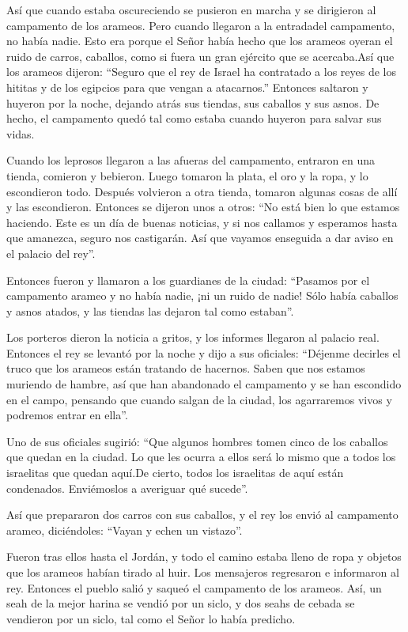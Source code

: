  Así que cuando estaba oscureciendo se pusieron en marcha y
se dirigieron al campamento de los arameos. Pero cuando llegaron a la
entradadel campamento, no había nadie.  Esto era porque el
Señor había hecho que los arameos oyeran el ruido de carros, caballos,
como si fuera un gran ejército que se acercaba.Así que los arameos
dijeron: ``Seguro que el rey de Israel ha contratado a los reyes de los
hititas y de los egipcios para que vengan a atacarnos.'' 
Entonces saltaron y huyeron por la noche, dejando atrás sus tiendas, sus
caballos y sus asnos. De hecho, el campamento quedó tal como estaba
cuando huyeron para salvar sus vidas.

 Cuando los leprosos llegaron a las afueras del campamento,
entraron en una tienda, comieron y bebieron. Luego tomaron la plata, el
oro y la ropa, y lo escondieron todo. Después volvieron a otra tienda,
tomaron algunas cosas de allí y las escondieron.  Entonces
se dijeron unos a otros: ``No está bien lo que estamos haciendo. Este es
un día de buenas noticias, y si nos callamos y esperamos hasta que
amanezca, seguro nos castigarán. Así que vayamos enseguida a dar aviso
en el palacio del rey''.

 Entonces fueron y llamaron a los guardianes de la ciudad:
``Pasamos por el campamento arameo y no había nadie, ¡ni un ruido de
nadie! Sólo había caballos y asnos atados, y las tiendas las dejaron tal
como estaban''.

 Los porteros dieron la noticia a gritos, y los informes
llegaron al palacio real.  Entonces el rey se levantó por
la noche y dijo a sus oficiales: ``Déjenme decirles el truco que los
arameos están tratando de hacernos. Saben que nos estamos muriendo de
hambre, así que han abandonado el campamento y se han escondido en el
campo, pensando que cuando salgan de la ciudad, los agarraremos vivos y
podremos entrar en ella''.

 Uno de sus oficiales sugirió: ``Que algunos hombres tomen
cinco de los caballos que quedan en la ciudad. Lo que les ocurra a ellos
será lo mismo que a todos los israelitas que quedan aquí.De cierto,
todos los israelitas de aquí están condenados. Enviémoslos a averiguar
qué sucede''.

 Así que prepararon dos carros con sus caballos, y el rey
los envió al campamento arameo, diciéndoles: ``Vayan y echen un
vistazo''.

 Fueron tras ellos hasta el Jordán, y todo el camino estaba
lleno de ropa y objetos que los arameos habían tirado al huir. Los
mensajeros regresaron e informaron al rey.  Entonces el
pueblo salió y saqueó el campamento de los arameos. Así, un seah de la
mejor harina se vendió por un siclo, y dos seahs de cebada se vendieron
por un siclo, tal como el Señor lo había predicho.

